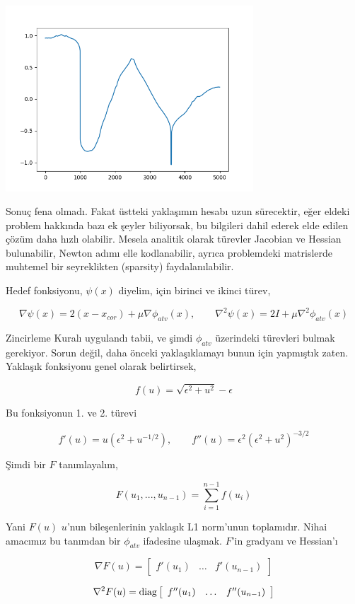 \documentclass[12pt,fleqn]{article}\usepackage{../../common}
\begin{document}
\includegraphics[width=25em]{func_60_tvd_02.png}

Sonuç fena olmadı. Fakat üstteki yaklaşımın hesabı uzun sürecektir, eğer
eldeki problem hakkında bazı ek şeyler biliyorsak, bu bilgileri dahil
ederek elde edilen çözüm daha hızlı olabilir. Mesela analitik olarak
türevler Jacobian ve Hessian bulunabilir, Newton adımı elle kodlanabilir,
ayrıca problemdeki matrislerde muhtemel bir seyreklikten (sparsity)
faydalanılabilir.

Hedef fonksiyonu, $\psi(x)$ diyelim, için birinci ve ikinci türev,

$$
\nabla \psi(x) = 2 (x-x_{cor}) + \mu \nabla \phi_{atv}(x), \qquad
\nabla^2 \psi(x) = 2 I + \mu \nabla^2 \phi_{atv} (x)
$$

Zincirleme Kuralı uygulandı tabii, ve şimdi $\phi_{atv}$ üzerindeki
türevleri bulmak gerekiyor. Sorun değil, daha önceki yaklaşıklamayı bunun
için yapmıştık zaten. Yaklaşık fonksiyonu genel olarak belirtirsek, 

$$
f(u) = \sqrt{\epsilon^2 + u^2} - \epsilon
$$

Bu fonksiyonun 1. ve 2. türevi

$$
f'(u) = u(\epsilon^2 + u^{-1/2} ), \qquad
f''(u) = \epsilon^2 (\epsilon^2 + u^2)^{-3/2}
$$

Şimdi bir $F$ tanımlayalım,

$$
F(u_1,..., u_{n-1}) = \sum_{i=1}^{n-1} f(u_i)
$$

Yani $F(u)$ $u$'nun bileşenlerinin yaklaşık L1 norm'unun toplamıdır. Nihai
amacımız bu tanımdan bir $\phi_{atv}$ ifadesine ulaşmak. $F$'in gradyanı ve
Hessian'ı

$$
\nabla F(u) = \left[\begin{array}{ccc} f'(u_1) & \dots & f'(u_{n-1}) \end{array}\right]
$$

$$
\nabla^2 F(u) = 
\operatorname{diag} 
\left[\begin{array}{ccc} f''(u_1) & \dots & f''(u_{n-1}) \end{array}\right] 
$$
\end{document}
